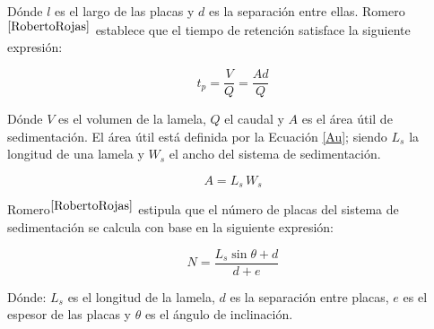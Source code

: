 \noindent
\justify

D\'onde $l$ es el largo de las placas y $d$ es la separaci\'on entre ellas. Romero$^{\cite{RobertoRojas}}$ establece que el tiempo de retenci\'on satisface la siguiente expresi\'on:

\begin{equation}
	t_p = \frac{V}{Q} = \frac{A d}{Q}
\end{equation}

\noindent
\justify

D\'onde $V$ es el volumen de la lamela, $Q$ el caudal y $A$ es el \'area \'util de sedimentaci\'on. El \'area \'util est\'a definida por la Ecuaci\'on \ref{Au}; siendo $L_s$ la longitud de una lamela y $W_s$ el ancho del sistema de sedimentaci\'on.

\begin{equation}
	A = L_s \, W_s
	\label{Au}
\end{equation}

\noindent
\justify

Romero$^{\cite{RobertoRojas}}$ estipula que el n\'umero de placas del sistema de sedimentaci\'on se calcula con base en la siguiente expresi\'on:

\begin{equation}
	N = \frac{L_s \sin \theta + d}{d+e}
	\label{NL}
\end{equation}

\noindent
\justify

D\'onde: $L_s$ es el longitud de la lamela, $d$ es la separaci\'on entre placas, $e$ es el espesor de las placas y $\theta$ es el \'angulo de inclinaci\'on.
